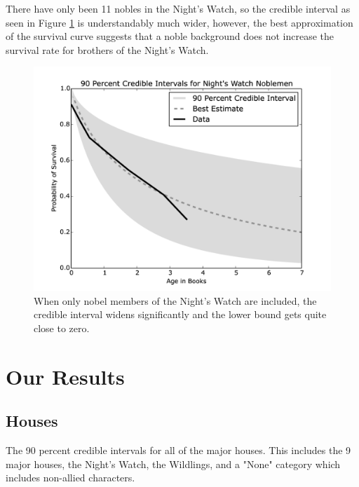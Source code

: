 \documentclass{article}
\begin{document}
There have only been 11 nobles in the Night's Watch, so the credible interval as seen in Figure \ref{fig:nwnobelcred} is understandably much wider, however, the best approximation of the survival curve suggests that a noble background does not increase the survival rate for brothers of the Night's Watch.

 \begin{figure}[ht!]
\centering
\includegraphics[width=5in]{NWNExp.png}
\caption{When only nobel members of the Night's Watch are included, the credible interval widens significantly and the lower bound gets quite close to zero.}
\label{fig:nwnobelcred}
\end{figure}

\section{Our Results}
\subsection{Houses}

The 90 percent credible intervals for all of the major houses.  This includes the 9 major houses, the Night's Watch, the Wildlings, and a "None" category which includes non-allied characters.
\end{document}
